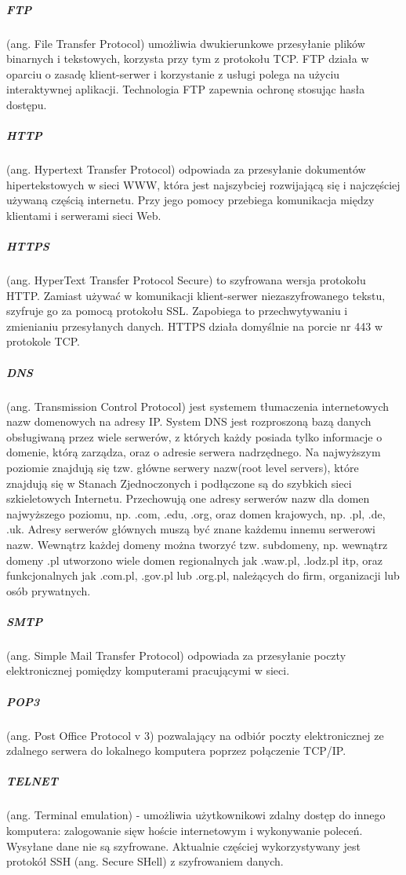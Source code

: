 \documentclass[a4paper,twoside]{report}
\begin{document}
\medskip 
\subparagraph{FTP} (ang. File Transfer Protocol) umożliwia dwukierunkowe przesyłanie plików binarnych i tekstowych, korzysta przy tym z protokołu TCP. FTP działa w oparciu o zasadę klient-serwer i korzystanie z usługi polega na użyciu interaktywnej aplikacji. Technologia FTP zapewnia ochronę stosując hasła dostępu.

\subparagraph{HTTP} (ang. Hypertext Transfer Protocol) odpowiada  za  przesyłanie  dokumentów  hipertekstowych  w  sieci  WWW,  która  jest najszybciej rozwijającą się i najczęściej używaną częścią internetu. Przy jego pomocy przebiega komunikacja między klientami i serwerami sieci Web.

\subparagraph{HTTPS} (ang. HyperText Transfer Protocol Secure) to szyfrowana wersja protokołu HTTP. Zamiast używać w komunikacji klient-serwer niezaszyfrowanego tekstu, szyfruje go za pomocą protokołu SSL. Zapobiega to przechwytywaniu i zmienianiu przesyłanych danych.
HTTPS działa domyślnie na porcie nr 443 w protokole TCP.

\subparagraph{DNS} (ang. Transmission   Control   Protocol) jest systemem tłumaczenia internetowych nazw domenowych na adresy IP. 
System  DNS  jest  rozproszoną  bazą  danych obsługiwaną przez wiele serwerów, z których każdy posiada tylko informacje o domenie, którą zarządza, oraz o adresie serwera nadrzędnego. Na najwyższym poziomie znajdują się tzw. główne serwery nazw(root  level  servers),  które  znajdują  się  w  Stanach  Zjednoczonych  i  podłączone  są  do  szybkich  sieci szkieletowych Internetu. Przechowują one adresy serwerów nazw dla domen najwyższego poziomu, np. .com, .edu, .org, oraz domen krajowych, np. .pl, .de, .uk. Adresy serwerów głównych muszą być znane każdemu  innemu  serwerowi  nazw.  Wewnątrz  każdej  domeny  można  tworzyć  tzw.  subdomeny,  np. wewnątrz domeny .pl utworzono wiele domen regionalnych jak .waw.pl, .lodz.pl itp, oraz funkcjonalnych jak .com.pl, .gov.pl lub .org.pl, należących do firm, organizacji lub osób prywatnych. 

\subparagraph{SMTP} (ang. Simple Mail Transfer Protocol) odpowiada za przesyłanie poczty elektronicznej pomiędzy komputerami pracującymi w sieci.

\subparagraph{POP3} (ang. Post Office Protocol v 3) pozwalający na odbiór poczty elektronicznej ze zdalnego serwera do lokalnego komputera poprzez połączenie TCP/IP. 

\subparagraph{TELNET} (ang. Terminal emulation) - umożliwia użytkownikowi zdalny dostęp do innego komputera: zalogowanie sięw hoście internetowym i wykonywanie poleceń. Wysyłane dane nie są szyfrowane. Aktualnie częściej wykorzystywany jest protokół SSH (ang. Secure SHell) z szyfrowaniem danych.
\end{document}
